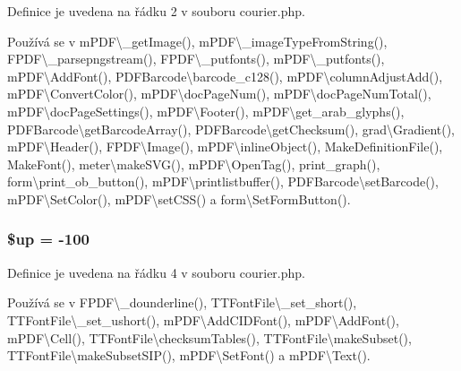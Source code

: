 Definice je uvedena na řádku 2 v souboru courier.\-php.



Používá se v m\-P\-D\-F\textbackslash{}\-\_\-get\-Image(), m\-P\-D\-F\textbackslash{}\-\_\-image\-Type\-From\-String(), F\-P\-D\-F\textbackslash{}\-\_\-parsepngstream(), F\-P\-D\-F\textbackslash{}\-\_\-putfonts(), m\-P\-D\-F\textbackslash{}\-\_\-putfonts(), m\-P\-D\-F\textbackslash{}\-Add\-Font(), P\-D\-F\-Barcode\textbackslash{}barcode\-\_\-c128(), m\-P\-D\-F\textbackslash{}column\-Adjust\-Add(), m\-P\-D\-F\textbackslash{}\-Convert\-Color(), m\-P\-D\-F\textbackslash{}doc\-Page\-Num(), m\-P\-D\-F\textbackslash{}doc\-Page\-Num\-Total(), m\-P\-D\-F\textbackslash{}doc\-Page\-Settings(), m\-P\-D\-F\textbackslash{}\-Footer(), m\-P\-D\-F\textbackslash{}get\-\_\-arab\-\_\-glyphs(), P\-D\-F\-Barcode\textbackslash{}get\-Barcode\-Array(), P\-D\-F\-Barcode\textbackslash{}get\-Checksum(), grad\textbackslash{}\-Gradient(), m\-P\-D\-F\textbackslash{}\-Header(), F\-P\-D\-F\textbackslash{}\-Image(), m\-P\-D\-F\textbackslash{}inline\-Object(), Make\-Definition\-File(), Make\-Font(), meter\textbackslash{}make\-S\-V\-G(), m\-P\-D\-F\textbackslash{}\-Open\-Tag(), print\-\_\-graph(), form\textbackslash{}print\-\_\-ob\-\_\-button(), m\-P\-D\-F\textbackslash{}printlistbuffer(), P\-D\-F\-Barcode\textbackslash{}set\-Barcode(), m\-P\-D\-F\textbackslash{}\-Set\-Color(), m\-P\-D\-F\textbackslash{}set\-C\-S\-S() a form\textbackslash{}\-Set\-Form\-Button().

\hypertarget{courier_8php_a6b5ad2ac55f9df46e8f34e78fbd6f176}{
\subsubsection[{\$up}]{\setlength{\rightskip}{0pt plus 5cm}\$up = -\/100}}\label{courier_8php_a6b5ad2ac55f9df46e8f34e78fbd6f176}


Definice je uvedena na řádku 4 v souboru courier.\-php.



Používá se v F\-P\-D\-F\textbackslash{}\-\_\-dounderline(), T\-T\-Font\-File\textbackslash{}\-\_\-set\-\_\-short(), T\-T\-Font\-File\textbackslash{}\-\_\-set\-\_\-ushort(), m\-P\-D\-F\textbackslash{}\-Add\-C\-I\-D\-Font(), m\-P\-D\-F\textbackslash{}\-Add\-Font(), m\-P\-D\-F\textbackslash{}\-Cell(), T\-T\-Font\-File\textbackslash{}checksum\-Tables(), T\-T\-Font\-File\textbackslash{}make\-Subset(), T\-T\-Font\-File\textbackslash{}make\-Subset\-S\-I\-P(), m\-P\-D\-F\textbackslash{}\-Set\-Font() a m\-P\-D\-F\textbackslash{}\-Text().

